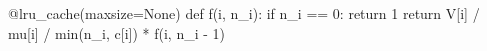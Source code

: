 
@lru_cache(maxsize=None)
def f(i, n_i):
    if n_i == 0:
        return 1
    return V[i] / mu[i] / min(n_i, c[i]) * f(i, n_i - 1)


